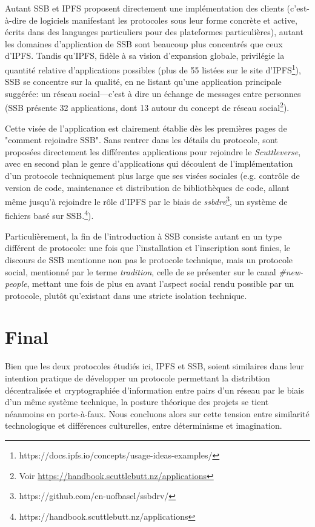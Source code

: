 \documentclass{article}
\begin{document}
Autant SSB et IPFS proposent directement une implémentation des clients (c'est-à-dire de logiciels manifestant les protocoles sous leur forme concrète et active, écrits dans des languages particuliers pour des plateformes particulières), autant les domaines d'application de SSB sont beaucoup plus concentrés que ceux d'IPFS. Tandis qu'IPFS, fidèle à sa vision d'expansion globale, privilégie la quantité relative d'applications possibles (plus de 55 listées sur le site d'IPFS\footnote{https://docs.ipfs.io/concepts/usage-ideas-examples/}), SSB se concentre sur la qualité, en ne listant qu'une application principale suggérée: un réseau social—c'est à dire un échange de messages entre personnes (SSB présente 32 applications, dont 13 autour du concept de réseau social\footnote{Voir \url{https://handbook.scuttlebutt.nz/applications}}).

Cette visée de l'application est clairement établie dès les premières pages de "comment rejoindre SSB". Sans rentrer dans les détails du protocole, sont proposées directement les différentes applications pour rejoindre le \emph{Scuttleverse}, avec en second plan le genre d'applications qui découlent de l'implémentation d'un protocole techniquement plus large que ses visées sociales (e.g. contrôle de version de code, maintenance et distribution de bibliothèques de code, allant même jusqu'à rejoindre le rôle d'IPFS par le biais de \emph{ssbdrv}\footnote{https://github.com/cn-uofbasel/ssbdrv/}, un système de fichiers basé sur SSB.\footnote{https://handbook.scuttlebutt.nz/applications}).

Particulièrement, la fin de l'introduction à SSB consiste autant en un type différent de protocole: une fois que l'installation et l'inscription sont finies, le discours de SSB mentionne non pas le protocole technique, mais un protocole social, mentionné par le terme \emph{tradition}, celle de se présenter sur le canal \emph{\#new-people}, mettant une fois de plus en avant l'aspect social rendu possible par un protocole, plutôt qu'existant dans une stricte isolation technique.


\section{Final}

Bien que les deux protocoles étudiés ici, IPFS et SSB, soient similaires dans leur intention pratique de développer un protocole permettant la distribtion décentralisée et cryptographiée d'information entre pairs d'un réseau par le biais d'un même système technique, la posture théorique des projets se tient néanmoins en porte-à-faux. Nous concluons alors sur cette tension entre similarité technologique et différences culturelles, entre déterminisme et imagination.
\end{document}
